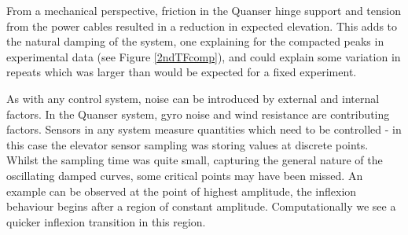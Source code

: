 From a mechanical perspective, friction in the Quanser hinge support and
tension from the power cables resulted in a reduction in expected
elevation. This adds to the natural damping of the system, one
explaining for the compacted peaks in experimental data (see Figure
\ref{2ndTFcomp}), and could explain some variation in repeats which was
larger than would be expected for a fixed experiment.

As with any control system, noise can be introduced by external and
internal factors. In the Quanser system, gyro noise and wind resistance
are contributing factors. Sensors in any system measure quantities which
need to be controlled - in this case the elevator sensor sampling was
storing values at discrete points. Whilst the sampling time was quite
small, capturing the general nature of the oscillating damped curves,
some critical points may have been missed. An example can be observed at
the point of highest amplitude, the inflexion behaviour begins after a
region of constant amplitude. Computationally we see a quicker inflexion
transition in this region.

\newpage
